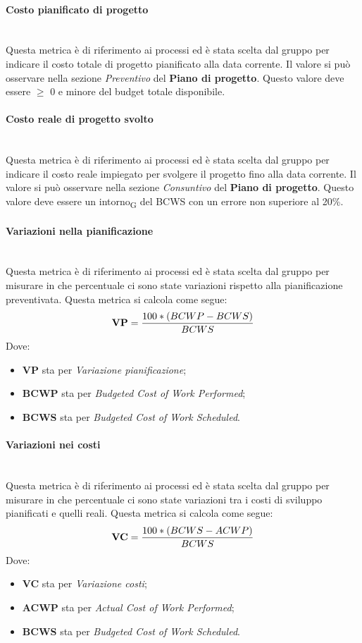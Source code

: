 \paragraph{Costo pianificato di progetto}\mbox{}\\
Questa metrica è di riferimento ai processi ed è stata scelta dal gruppo per indicare il costo totale di progetto pianificato alla data corrente. Il valore si può osservare nella sezione \textit{Preventivo} del \textbf{Piano di progetto}. Questo valore deve essere $\geq$ 0 e minore del budget totale disponibile.
\paragraph{Costo reale di progetto svolto}\mbox{}\\
Questa metrica è di riferimento ai processi ed è stata scelta dal gruppo per indicare il costo reale impiegato per svolgere il progetto fino alla data corrente. Il valore si può osservare nella sezione \textit{Consuntivo} del \textbf{Piano di progetto}. Questo valore deve essere un intorno\textsubscript{G} del BCWS con un errore non superiore al 20\%.
\paragraph{Variazioni nella pianificazione}\mbox{}\\
Questa metrica è di riferimento ai processi ed è stata scelta dal gruppo per misurare in che percentuale ci sono state variazioni rispetto alla pianificazione preventivata. Questa metrica si calcola come segue:
\begin{align*}
	\centering
	\textbf{VP} = \frac{100 * (BCWP - BCWS)}{BCWS}
\end{align*}
Dove:
\begin{itemize}
	\item \textbf{VP} sta per \textit{Variazione pianificazione};
	\item \textbf{BCWP} sta per \textit{Budgeted Cost of Work Performed};
	\item \textbf{BCWS} sta per \textit{Budgeted Cost of Work Scheduled}.
\end{itemize}
\paragraph{Variazioni nei costi}\mbox{}\\
Questa metrica è di riferimento ai processi ed è stata scelta dal gruppo per misurare in che percentuale ci sono state variazioni tra i costi di sviluppo pianificati e quelli reali. Questa metrica si calcola come segue:
\begin{align*}
	\centering
	\textbf{VC} = \frac{100 * (BCWS - ACWP)}{BCWS}
\end{align*}
Dove:
\begin{itemize}
	\item \textbf{VC} sta per \textit{Variazione costi};
	\item \textbf{ACWP} sta per \textit{Actual Cost of Work Performed};
	\item \textbf{BCWS} sta per \textit{Budgeted Cost of Work Scheduled}.
\end{itemize}
